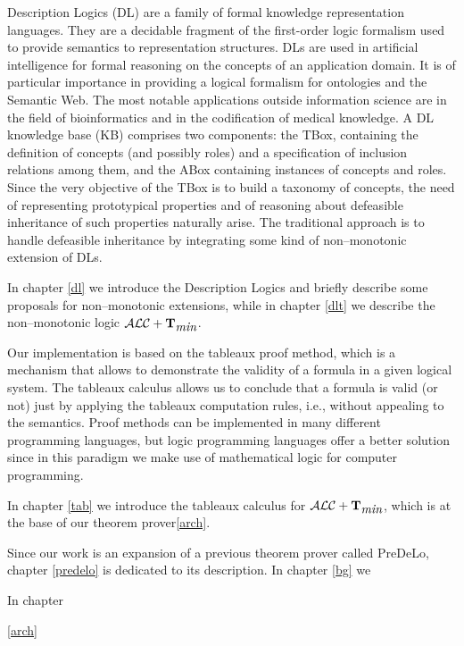 \documentclass[a4paper, 11pt, oneside]{duthesis}
\newcommand{\tip}{{\bf T}}
\newcommand{\alctmin}{\mathcal{ALC}+\tip_{\mbox{\em min}}}
\begin{document}
Description Logics (DL) are a family of formal knowledge representation languages. They are a decidable fragment of the first-order logic formalism used to provide semantics to representation structures.
DLs are used in artificial intelligence for formal reasoning on the concepts of an application domain. It is of particular importance in providing a logical formalism for ontologies and the Semantic Web. The most notable applications outside information science are in the field of bioinformatics and in the codification of medical knowledge. A DL knowledge base (KB) comprises two components: the TBox, containing the definition of concepts (and possibly roles) and a specification of inclusion relations among them, and the ABox containing instances of concepts and roles. Since the very objective of the TBox is to build a taxonomy of concepts, the need of representing prototypical properties and of reasoning about defeasible inheritance of such properties naturally arise. The traditional approach is to handle defeasible inheritance by integrating some kind of non--monotonic extension of DLs.

In chapter \ref{dl} we introduce the Description Logics and briefly describe some proposals for non--monotonic extensions, while in chapter \ref{dlt} we describe the non--monotonic logic $\alctmin$.

Our implementation is based on the tableaux proof method, which is a mechanism that allows to demonstrate the validity of a formula in a given logical system.
The tableaux calculus allows us to conclude that a formula is valid (or not) just by applying the tableaux computation rules, i.e., without appealing to the semantics.
Proof methods can be implemented in many different programming languages, but logic programming languages offer a better solution since in this paradigm we make use of mathematical logic for computer programming.

In chapter \ref{tab} we introduce the tableaux calculus for $\alctmin$, which is at the base of our theorem prover\ref{arch}.

Since our work is an expansion of a previous theorem prover called PreDeLo, chapter \ref{predelo} is dedicated to its description. In chapter \ref{bg} we 

In chapter 


\ref{arch}\\
\end{document}
